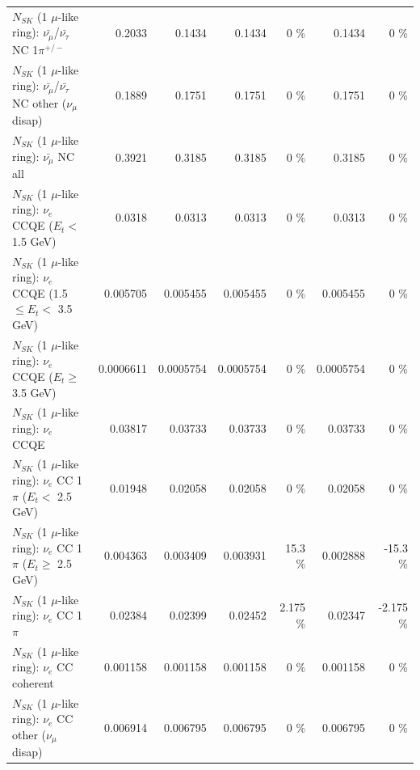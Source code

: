 \begin{table}
\begin{tabular}{| l | r | r | r  r | r  r |}
\hline
  $N_{SK}$ (1 $\mu$-like ring): $\bar{\nu_\mu}$/$\bar{\nu_\tau}$ NC 1$\pi^{+/-}$ &          0.2033 &          0.1434 &          0.1434 &        0 \%  &          0.1434 &        0 \%  \\ 
$N_{SK}$ (1 $\mu$-like ring): $\bar{\nu_\mu}$/$\bar{\nu_\tau}$ NC other ($\nu_\mu$ disap) &          0.1889 &          0.1751 &          0.1751 &        0 \%  &          0.1751 &        0 \%  \\ 
                          $N_{SK}$ (1 $\mu$-like ring): $\bar{\nu_{\mu}}$ NC all &          0.3921 &          0.3185 &          0.3185 &        0 \%  &          0.3185 &        0 \%  \\ 
\hline
\hline
\hline
                  $N_{SK}$ (1 $\mu$-like ring): $\nu_e$ CCQE ($E_{t} <$ 1.5 GeV) &          0.0318 &          0.0313 &          0.0313 &        0 \%  &          0.0313 &        0 \%  \\ 
         $N_{SK}$ (1 $\mu$-like ring): $\nu_e$ CCQE (1.5 $\leq E_{t} <$ 3.5 GeV) &        0.005705 &        0.005455 &        0.005455 &        0 \%  &        0.005455 &        0 \%  \\ 
               $N_{SK}$ (1 $\mu$-like ring): $\nu_e$ CCQE ($E_{t} \geq$ 3.5 GeV) &       0.0006611 &       0.0005754 &       0.0005754 &        0 \%  &       0.0005754 &        0 \%  \\ 
\hline
                                      $N_{SK}$ (1 $\mu$-like ring): $\nu_e$ CCQE &         0.03817 &         0.03733 &         0.03733 &        0 \%  &         0.03733 &        0 \%  \\ 
\hline
             $N_{SK}$ (1 $\mu$-like ring): $\nu_e$ CC 1$\pi$ ($E_{t} <$ 2.5 GeV) &         0.01948 &         0.02058 &         0.02058 &        0 \%  &         0.02058 &        0 \%  \\ 
          $N_{SK}$ (1 $\mu$-like ring): $\nu_e$ CC 1$\pi$ ($E_{t} \geq$ 2.5 GeV) &        0.004363 &        0.003409 &        0.003931 &     15.3 \%  &        0.002888 &    -15.3 \%  \\ 
\hline
                                 $N_{SK}$ (1 $\mu$-like ring): $\nu_e$ CC 1$\pi$ &         0.02384 &         0.02399 &         0.02452 &    2.175 \%  &         0.02347 &   -2.175 \%  \\ 
                               $N_{SK}$ (1 $\mu$-like ring): $\nu_e$ CC coherent &        0.001158 &        0.001158 &        0.001158 &        0 \%  &        0.001158 &        0 \%  \\ 
                $N_{SK}$ (1 $\mu$-like ring): $\nu_e$ CC other ($\nu_\mu$ disap) &        0.006914 &        0.006795 &        0.006795 &        0 \%  &        0.006795 &        0 \%  \\ 

\end{tabular}
\end{table}
